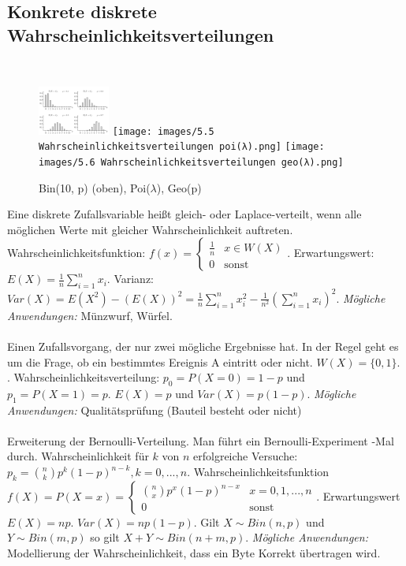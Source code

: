 \subsection{Konkrete diskrete Wahrscheinlichkeitsverteilungen}
\, %
\begin{figure}
    \vspace{-7mm}
    \centering
    \includegraphics[width=0.21\textwidth]{images/5.3 Wahrscheinlichkeitsverteilungen bin(10,p).png}
    \texttt{[image: images/5.5 Wahrscheinlichkeitsverteilungen poi(λ).png]}
    \texttt{[image: images/5.6 Wahrscheinlichkeitsverteilungen geo(λ).png]}
    \caption{Bin(10, p) (oben), Poi($\lambda$), Geo(p)}
    \vspace{-26mm}
    \label{fig:disk_dist}
\end{figure}
 Eine diskrete Zufallsvariable heißt gleich- oder Laplace-verteilt, wenn alle möglichen Werte mit gleicher Wahrscheinlichkeit auftreten. Wahrscheinlichkeitsfunktion: $f(x) = \begin{cases}
    \frac{1}{n}&x\in W(X)\\
    0&\text{sonst}
\end{cases}$. Erwartungswert: $E(X) = \frac{1}{n}\sum_{i=1}^nx_i$. Varianz: $Var(X) = E(X^2) - (E(X))^2 = \frac{1}{n}\sum_{i=1}^nx_i^2 - \frac{1}{n^2}(\sum_{i=1}^nx_i)^2$. \emph{Mögliche Anwendungen:} Münzwurf, Würfel. \\\\
 Einen Zufallsvorgang, der nur zwei mögliche Ergebnisse hat. In der Regel geht es um die Frage, ob ein bestimmtes Ereignis A eintritt oder nicht. $W(X) = \{0,1\}$. . Wahrscheinlichkeitsverteilung: $p_0 = P(X=0) = 1 - p$ und $p_1 = P(X=1) = p$. $E(X) = p$ und $Var(X) = p(1-p)$. \emph{Mögliche Anwendungen:} Qualitätsprüfung (Bauteil besteht oder nicht)\\\\
 Erweiterung der Bernoulli-Verteilung. Man führt ein Bernoulli-Experiment -Mal durch. Wahrscheinlichkeit für $k$ von $n$ erfolgreiche Versuche: $p_k = \binom{n}{k} p^k  (1-p)^{n-k}, k = 0, ..., n$. Wahrscheinlichkeitsfunktion $f(X) = P(X = x) = \begin{cases}
    \binom{n}{x} p^x  (1-p)^{n-x} & x = 0, 1, ..., n\\
    0 & \text{sonst}
\end{cases}$. Erwartungswert $E(X) = np$. $Var(X) = np(1-p)$. Gilt $X \sim Bin(n, p)$ und $Y \sim Bin(m, p)$ so gilt $X + Y \sim Bin(n + m, p)$. \emph{Mögliche Anwendungen:} Modellierung der Wahrscheinlichkeit, dass ein Byte Korrekt übertragen wird.\\\\
